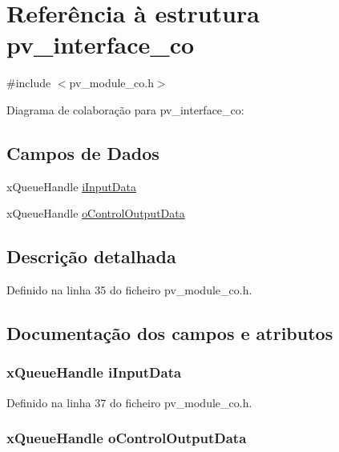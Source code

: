\hypertarget{structpv__interface__co}{\section{Referência à estrutura pv\-\_\-interface\-\_\-co}
\label{structpv__interface__co}
}


{\ttfamily \#include $<$pv\-\_\-module\-\_\-co.\-h$>$}



Diagrama de colaboração para pv\-\_\-interface\-\_\-co\-:
\subsection*{Campos de Dados}
\begin{DoxyCompactItemize}
\item 
x\-Queue\-Handle \hyperlink{structpv__interface__co_ad057767ef15274f0933ad1821fea7239}{i\-Input\-Data}
\item 
x\-Queue\-Handle \hyperlink{structpv__interface__co_adeb92ab25c31742c709ae51f96cbf10a}{o\-Control\-Output\-Data}
\end{DoxyCompactItemize}


\subsection{Descrição detalhada}


Definido na linha 35 do ficheiro pv\-\_\-module\-\_\-co.\-h.



\subsection{Documentação dos campos e atributos}
\hypertarget{structpv__interface__co_ad057767ef15274f0933ad1821fea7239}{
\subsubsection[{i\-Input\-Data}]{\setlength{\rightskip}{0pt plus 5cm}x\-Queue\-Handle i\-Input\-Data}}\label{structpv__interface__co_ad057767ef15274f0933ad1821fea7239}


Definido na linha 37 do ficheiro pv\-\_\-module\-\_\-co.\-h.

\hypertarget{structpv__interface__co_adeb92ab25c31742c709ae51f96cbf10a}{
\subsubsection[{o\-Control\-Output\-Data}]{\setlength{\rightskip}{0pt plus 5cm}x\-Queue\-Handle o\-Control\-Output\-Data}}\label{structpv__interface__co_adeb92ab25c31742c709ae51f96cbf10a}


